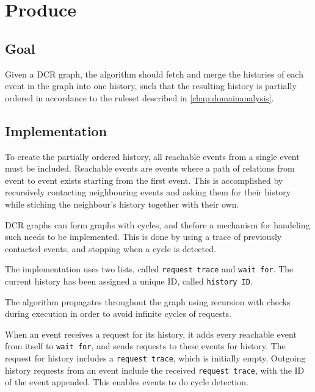 \section{Produce}
\subsection{Goal} %
Given a DCR graph, the algorithm should fetch and merge the histories of each event in the graph into one history, such that the resulting history is partially ordered in accordance to the ruleset described in \autoref{chap:domainanalysis}. 


\subsection{Implementation} %
To create the partially ordered history, all reachable events from a single event must be included. Reachable events are events where a path of relations from event to event exists starting from the first event. This is accomplished by recursively contacting neighbouring events and asking them for their history while stiching the neighbour's history together with their own. \bigskip

DCR graphs can form graphs with cycles, and thefore a mechanism for handeling such needs to be implemented. This is done by using a trace of previously contacted events, and stopping when a cycle is detected. 

The implementation uses two lists, called \texttt{request trace} and \texttt{wait for}. The current history has been assigned a unique ID, called \texttt{history ID}.

The algorithm propagates throughout the graph using recursion with checks during execution in order to avoid infinite cycles of requests. \bigskip

When an event receives a request for its history, it adds every reachable event from itself to \texttt{wait for}, and sends requests to these events for history. The request for history includes a \texttt{request trace}, which is initially empty. Outgoing history requests from an event include the received \texttt{request trace}, with the ID of the event appended. This enables events to do cycle detection. \bigskip


